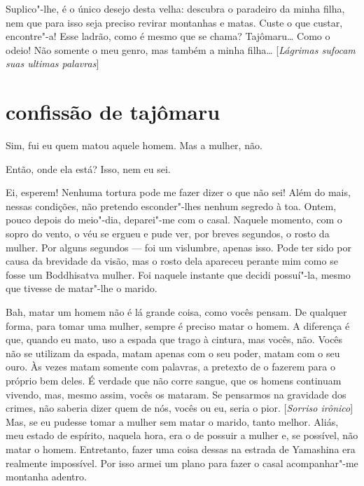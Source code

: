 Suplico"-lhe, é o único desejo desta velha: descubra o paradeiro da minha
filha, nem que para isso seja preciso revirar montanhas e matas. Custe
o que custar, encontre"-a! Esse ladrão, como é mesmo que se chama?
Tajômaru\ldots{} Como o odeio! Não somente o meu genro, mas também a minha
filha\ldots{} [\textit{Lágrimas sufocam suas ultimas palavras}]

\section*{confissão de tajômaru}

Sim, fui eu quem matou aquele homem. Mas a mulher, não.

Então, onde ela está? Isso, nem eu sei.

Ei, esperem! Nenhuma tortura pode me fazer dizer o que não sei! Além do
mais, nessas condições, não pretendo esconder"-lhes nenhum segredo à
toa. Ontem, pouco depois do meio"-dia, deparei"-me com o casal. Naquele
momento, com o sopro do vento, o véu se ergueu e pude ver, por breves
segundos, o rosto da mulher. Por alguns segundos --- foi um vislumbre,
apenas isso. Pode ter sido por causa da brevidade da visão, mas o rosto
dela  apareceu perante mim como se fosse um Boddhisatva mulher. Foi
naquele instante que decidi possuí"-la, mesmo que tivesse de matar"-lhe o
marido.

Bah, matar um homem não é lá grande coisa, como vocês pensam. De
qualquer forma, para tomar uma mulher, sempre é preciso matar o homem.
A diferença é que, quando eu mato, uso a espada que trago à cintura,
mas vocês, não. Vocês não se utilizam da espada, matam apenas com o seu
poder, matam com o seu ouro. Às vezes matam somente com palavras, a
pretexto de o fazerem para o próprio bem deles. É verdade que não corre
sangue, que os homens continuam vivendo, mas, mesmo assim, vocês os
mataram. Se pensarmos na gravidade dos crimes, não saberia dizer quem
de nós, vocês ou eu, seria o pior. [\textit{Sorriso irônico}] Mas, se eu
pudesse tomar a mulher sem matar o marido, tanto melhor. Aliás, meu
estado de espírito, naquela hora, era o de possuir a mulher e, se
possível, não matar o homem. Entretanto, fazer uma coisa dessas na
estrada de Yamashina era realmente impossível. Por isso armei um plano
para fazer o casal acompanhar"-me montanha adentro.

